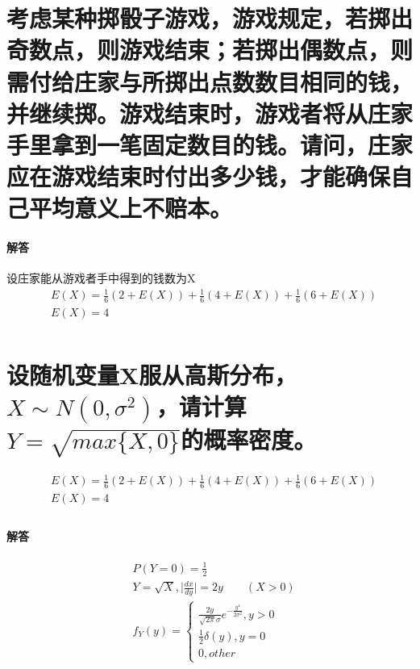 \documentclass[UTF8]{ctexart}
\begin{document}
\section{考虑某种掷骰子游戏，游戏规定，若掷出奇数点，则游戏结束；若掷出偶数点，则需付给庄家与所掷出点数数目相同的钱，并继续掷。游戏结束时，游戏者将从庄家手里拿到一笔固定数目的钱。请问，庄家应在游戏结束时付出多少钱，才能确保自己平均意义上不赔本。}
\paragraph{解答}
设庄家能从游戏者手中得到的钱数为X\\
\begin{equation*}
\begin{aligned}
&E(X)=\frac{1}{6}(2+E(X))+\frac{1}{6}(4+E(X))+\frac{1}{6}(6+E(X))\\
&E(X)=4\\
\end{aligned}
\end{equation*}
\section{设随机变量X服从高斯分布，$X\sim N(0,\sigma^2)$，请计算$Y=\sqrt{max\{X,0\}}$的概率密度。}
\begin{equation*}
\begin{aligned}
&E(X)=\frac{1}{6}(2+E(X))+\frac{1}{6}(4+E(X))+\frac{1}{6}(6+E(X))\\
&E(X)=4\\
\end{aligned}
\end{equation*}
\paragraph{解答}
\begin{equation*}
\begin{aligned}
&P(Y=0)=\frac{1}{2}\\
&Y=\sqrt{X},\lvert\frac{dx}{dy}\rvert=2y\quad\quad (X>0)\\
&f_Y(y)=\begin{cases}
\frac{2y}{\sqrt{2\pi}\sigma}e^{-\frac{y^4}{2\sigma^2}},y>0\\
\frac{1}{2}\delta(y),y=0\\
0, other
\end{cases}
\end{aligned}
\end{equation*}
\end{document}
